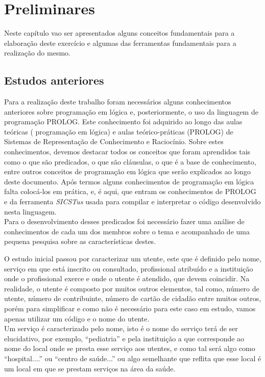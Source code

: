 \chapter{Preliminares}
\label{cap:p2}
Neste capítulo vao ser apresentados alguns conceitos fundamentais para a elaboração deste
exercício e algumas das ferramentas fundamentais para a realização do mesmo.


\section{Estudos anteriores}
\label{p2:estudp}
Para a realização deste trabalho foram necessários alguns conhecimentos anteriores sobre programação em lógica e, posteriormente, o uso da linguagem de programação PROLOG.
Este conhecimento foi adquirido ao longo das aulas teóricas ( programação em lógica) e aulas
teórico-práticas (PROLOG) de Sistemas de Representação de Conhecimento e Raciocínio.
Sobre estes conhecimentos, devemos destacar todos os conceitos que foram aprendidos tais
como o que são predicados, o que são cláusulas, o que é a base de conhecimento, entre outros
conceitos de programação em lógica que serão explicados ao longo deste documento.
Após termos alguns conhecimentos de programação em lógica falta colocá-los em prática,
e, é aqui, que entram os conhecimentos de PROLOG e da ferramenta \textit{SICSTus} usada para
compilar e interpretar o código desenvolvido nesta linguagem.
\\

Para o desenvolvimento desses predicados foi necessário fazer uma análise de conhecimentos de cada um dos membros sobre o tema e acompanhado de uma pequena pesquisa sobre as características destes.

O estudo inicial passou por caracterizar um utente, este que é definido pelo nome, serviço em que está inscrito ou consultado, profissional atribuído e a instituição onde o profissional exerce e onde o utente é atendido, que devem coincidir. Na realidade, o utente é composto por muitos outros elementos, tal como, número de utente, número de contribuinte, número de cartão de cidadão entre muitos outros, porém para simplificar e como não é necessário para este caso em estudo, vamos apenas utilizar um código e o nome do utente. 
\\

Um serviço é caracterizado pelo nome, isto é o nome do serviço terá de ser elucidativo, por exemplo, “pediatria” e pela instituição a que corresponde ao nome do local onde se presta esse serviço aos utentes, e como tal será algo como “hospital....” ou “centro de saúde...” ou algo semelhante que reflita que esse local é um local em que se prestam serviços na área da saúde.
\\


